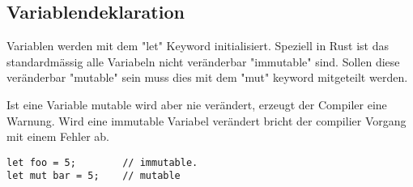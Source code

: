 \subsection{Variablendeklaration}
Variablen werden mit dem "let" Keyword initialisiert. Speziell in Rust ist das standardmässig alle Variabeln nicht veränderbar "immutable" sind. Sollen diese veränderbar "mutable" sein muss dies mit dem "mut" keyword mitgeteilt werden.

Ist eine Variable mutable wird aber nie verändert, erzeugt der Compiler eine Warnung. Wird eine immutable Variabel verändert bricht der compilier Vorgang mit einem Fehler ab.

\begin{lstlisting}
let foo = 5; 		// immutable.
let mut bar = 5; 	// mutable
\end{lstlisting}